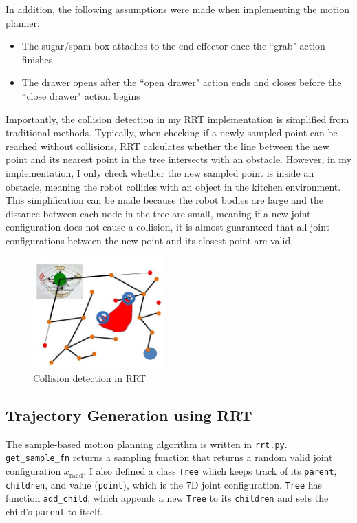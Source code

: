 \documentclass{article}
\begin{document}
In addition, the following assumptions were made when implementing the motion planner:
\begin{itemize}
    \item The sugar/spam box attaches to the end-effector once the ``grab" action finishes
    \item The drawer opens after the ``open drawer" action ends and closes before the ``close drawer" action begins
\end{itemize}

Importantly, the collision detection in my RRT implementation is simplified from traditional methods. Typically, when checking if a newly sampled point can be reached without collisions, RRT calculates whether the line between the new point and its nearest point in the tree intersects with an obstacle. However, in my implementation, I only check whether the new sampled point is inside an obstacle, meaning the robot collides with an object in the kitchen environment. This simplification can be made because the robot bodies are large and the distance between each node in the tree are small, meaning if a new joint configuration does not cause a collision, it is almost guaranteed that all joint configurations between the new point and its closest point are valid.

\begin{figure}[h]
    \centering
    \includegraphics[width=190px]{rrt_collision.jpg}
    \caption{Collision detection in RRT}
    \label{fig:rrt_collision}
\end{figure}


\subsection{Trajectory Generation using RRT}
\label{sec:rrt}

The sample-based motion planning algorithm is written in \texttt{rrt.py}. \texttt{get\_sample\_fn} returns a sampling function that returns a random valid joint configuration $x_\text{rand}$. I also defined a class \texttt{Tree} which keeps track of its \texttt{parent}, \texttt{children}, and value (\texttt{point}), which is the 7D joint configuration. \texttt{Tree} has function \texttt{add\_child}, which appends a new \texttt{Tree} to its \texttt{children} and sets the child's \texttt{parent} to itself. 
\end{document}
